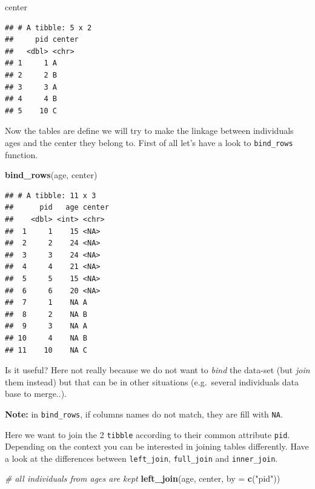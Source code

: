 \documentclass[
]{book}
\newenvironment{Shaded}{\begin{snugshade}}{\end{snugshade}}
\newcommand{\AttributeTok}[1]{\textcolor[rgb]{0.13,0.29,0.53}{#1}}
\newcommand{\CommentTok}[1]{\textcolor[rgb]{0.56,0.35,0.01}{\textit{#1}}}
\newcommand{\FunctionTok}[1]{\textcolor[rgb]{0.13,0.29,0.53}{\textbf{#1}}}
\newcommand{\NormalTok}[1]{#1}
\newcommand{\StringTok}[1]{\textcolor[rgb]{0.31,0.60,0.02}{#1}}
\begin{document}
\begin{Shaded}
\begin{Highlighting}[]
\NormalTok{center}
\end{Highlighting}
\end{Shaded}

\begin{verbatim}
## # A tibble: 5 x 2
##     pid center
##   <dbl> <chr> 
## 1     1 A     
## 2     2 B     
## 3     3 A     
## 4     4 B     
## 5    10 C
\end{verbatim}

Now the tables are define we will try to make the linkage between individuals ages and the center
they belong to.
First of all let's have a look to \texttt{bind\_rows} function.

\begin{Shaded}
\begin{Highlighting}[]
\FunctionTok{bind\_rows}\NormalTok{(age, center)}
\end{Highlighting}
\end{Shaded}

\begin{verbatim}
## # A tibble: 11 x 3
##      pid   age center
##    <dbl> <int> <chr> 
##  1     1    15 <NA>  
##  2     2    24 <NA>  
##  3     3    24 <NA>  
##  4     4    21 <NA>  
##  5     5    15 <NA>  
##  6     6    20 <NA>  
##  7     1    NA A     
##  8     2    NA B     
##  9     3    NA A     
## 10     4    NA B     
## 11    10    NA C
\end{verbatim}

Is it useful?
Here not really because we do not want to \emph{bind} the data-set (but \emph{join} them instead) but that can be in other situations (e.g.~several individuals data base to merge..).

\textbf{Note:} in \texttt{bind\_rows}, if columns names do not match, they are fill with \texttt{NA}.

Here we want to join the 2 \texttt{tibble} according to their common attribute \texttt{pid}. Depending
on the context you can be interested in joining tables differently. Have a look at the differences
between \texttt{left\_join}, \texttt{full\_join} and \texttt{inner\_join}.

\begin{Shaded}
\begin{Highlighting}[]
\CommentTok{\# all individuals from ages are kept}
\FunctionTok{left\_join}\NormalTok{(age, center, }\AttributeTok{by =} \FunctionTok{c}\NormalTok{(}\StringTok{"pid"}\NormalTok{))}
\end{Highlighting}
\end{Shaded}
\end{document}
